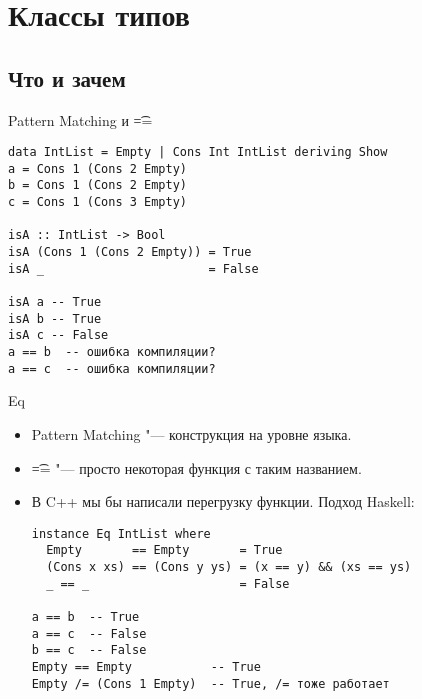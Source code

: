 \section{Классы типов}
\subsection{Что и зачем}

\begin{frame}
\end{frame}

\begin{frame}[fragile]{Pattern Matching и \t{==}}
\begin{verbatim}
data IntList = Empty | Cons Int IntList deriving Show
a = Cons 1 (Cons 2 Empty)
b = Cons 1 (Cons 2 Empty)
c = Cons 1 (Cons 3 Empty)

isA :: IntList -> Bool
isA (Cons 1 (Cons 2 Empty)) = True
isA _                       = False

isA a -- True
isA b -- True
isA c -- False
a == b  -- ошибка компиляции?
a == c  -- ошибка компиляции?
\end{verbatim}
\end{frame}

\begin{frame}[fragile]{Eq}
	\begin{itemize}
		\item Pattern Matching "--- конструкция на уровне языка.
		\item \t{==} "--- просто некоторая функция с таким названием.
		\item В C++ мы бы написали перегрузку функции. Подход Haskell:
\begin{verbatim}
instance Eq IntList where
  Empty       == Empty       = True
  (Cons x xs) == (Cons y ys) = (x == y) && (xs == ys)
  _ == _                     = False

a == b  -- True
a == c  -- False
b == c  -- False
Empty == Empty           -- True
Empty /= (Cons 1 Empty)  -- True, /= тоже работает
\end{verbatim}
	\end{itemize}
\end{frame}

